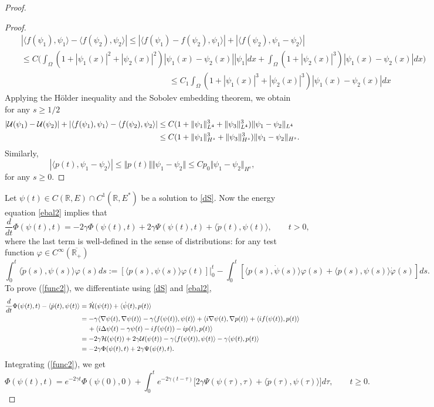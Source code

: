 \documentclass[11pt]{article}
\newcommand{\fr}{\frac}
\newcommand{\R}{{\mathbb R}}
\newcommand{\cH}{{\cal H}}
\newcommand{\cU}{{\cal U}}
\newcommand{\vp}{\varphi}
\newcommand{\De}{\Delta}
\newcommand{\ga}{\gamma}
\newcommand{\Om}{\Omega}
\newcommand{\na}{\nabla}
\newcommand{\ov}{\overline}
\newcommand{\5}{{\hspace{0.5mm}}}
\numberwithin{equation}{section}
\newcommand{\la}{\label}
\newcommand{\be}{\begin{equation}}
\newcommand{\ee}{\end{equation}}
\newcommand{\beqn}{\begin{eqnarray}}
\newcommand{\eeqn}{\end{eqnarray}}
\numberwithin{equation}{section}
\begin{document}
\begin{proof}
\begin{proof}
$$$$
\beqn\nonumber
&&|\langle f(\psi_1),\psi_1\rangle-\langle f(\psi_2),\psi_2 \rangle|\le |\langle f(\psi_1)-f(\psi_2),\psi_1\rangle|
+|\langle f(\psi_2),\psi_1-\psi_2 \rangle|\\
\nonumber
&&\le C\Big(\int_\Om (1+|\psi_1(x)|^2+|\psi_2(x)|^2)|\psi_1(x)-\psi_2(x)||\psi_1|dx+ \int_\Om (1+|\psi_2(x)|^3)|\psi_1(x)-\psi_2(x)|dx\Big)\\
\nonumber
 &&\qquad\qquad\qquad\qquad\qquad\qquad\qquad\qquad\qquad \le C_1\int_\Om (1+|\psi_1(x)|^3+|\psi_2(x)|^3)|\psi_1(x)-\psi_2(x)|dx
\eeqn
Applying the H\"older inequality and the Sobolev embedding theorem, we obtain for any $s\ge 1/2$
\begin{align}\nonumber
 |\cU(\psi_1)-\cU(\psi_2)|+|\langle f(\psi_1),\psi_1\rangle-\langle f(\psi_2),\psi_2 \rangle|
 &\le C(1+\Vert\psi_1\Vert_{L^4}^3+\Vert\psi_3\Vert_{L^4}^3)\Vert\psi_1-\psi_2\Vert_{L^4}\\
 \nonumber
 &\le C(1+\Vert\psi_1\Vert_{H^s}^3+\Vert\psi_3\Vert_{H^s}^3)\Vert\psi_1-\psi_2\Vert_{H^s}.
\end{align}
Similarly,
$$
| \langle p(t),\psi_1-\psi_2 \rangle|\le \Vert p(t)\Vert \Vert \psi_1-\psi_2\Vert\le Cp_0\Vert\psi_1-\psi_2\Vert_{H^s},
$$
for any $s\ge 0$.
\end{proof}

 Let $\psi(t)\in C(\R,E)\cap C^1(\R,E^*)$ be a solution to \eqref{dS}.
Now the energy equation \eqref{ebal2} implies that
\be\la{func2}
\fr d{dt}\Phi(\psi(t),t)=-2\ga \Phi(\psi(t),t)+2\ga \Psi(\psi(t),t)+\langle \dot p(t),\psi(t) \rangle,\qquad t>0,
 \ee
 where the last term is well-defined in the sense of distributions:
for any test function $\vp\in C^\infty(\ov{\R_+}) $
 \be\la{last}
 \int_0^t \langle \dot p(s),\psi(s) \rangle\vp(s)ds:=[\langle p(s),\psi(s)\rangle\vp(t)]
 \Big|_0^t-\int_0^t[\langle p(s),\dot\psi(s)\rangle\vp(s)+\langle p(s),\psi(s)\rangle\dot\vp(s)]ds.
 \ee
 To prove (\ref{func2}), we
 differentiate
 using
 \eqref{dS} and \eqref{ebal2},
\begin{align}\nonumber
\fr d{dt}\Phi(\psi(t),t)-\langle \dot p(t),\psi(t) \rangle&= 
\dot\cH (\psi(t))+\langle \dot\psi(t), p(t) \rangle\\
\nonumber
&=-\ga\langle \na \psi(t),\na\psi(t)\rangle-\ga\langle f(\psi(t)), \psi(t)\rangle+\langle i\na \psi(t),\na p(t)\rangle+\langle if(\psi(t)), p(t)\rangle\\
\nonumber
&\quad\,+\langle i\De\psi(t)-\ga\psi(t)-if(\psi(t))-ip(t), p(t) \rangle\\
\nonumber
&=-2\ga \cH(\psi(t))+2\ga \cU(\psi(t)) -\ga\langle f(\psi(t)), \psi(t)\rangle-\ga\langle \psi(t), p(t) \rangle\\
\nonumber
&= -2\ga \Phi(\psi(t),t)+2\ga \Psi(\psi(t),t).
\end{align}
 Integrating (\ref{func2}), we get
 \be\la{func22}
\Phi(\psi(t),t)=e^{-2\ga t} \Phi(\psi(0),0)+\int_0^t e^{-2\ga(t-\tau)}\big[ 2\ga\Psi(\psi(\tau),\tau)+\langle \dot p(\tau),\psi(\tau) \rangle\big]d\tau,\qquad t\ge 0.
 \ee


\end{proof}
\end{document}

